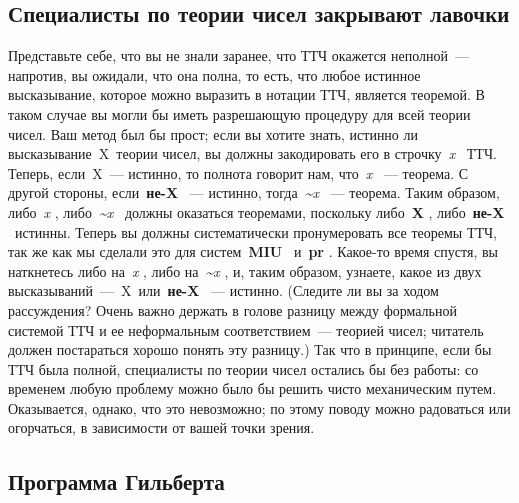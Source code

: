\documentclass[../main.tex]{subfiles}
\begin{document}
\subsection{Специалисты по теории чисел закрывают лавочки}

Представьте себе, что вы не знали заранее, что ТТЧ окажется неполной~--- напротив, вы ожидали, что она полна, то есть, что любое истинное высказывание, которое можно выразить в нотации ТТЧ, является теоремой. В таком случае вы могли бы иметь разрешающую процедуру для всей теории чисел. Ваш метод был бы прост; если вы хотите знать, истинно ли высказывание~X~теории чисел, вы должны закодировать его в строчку~\emph{x} ~ТТЧ. Теперь, если~X~--- истинно, то полнота говорит нам, что~\emph{x} ~--- теорема. С другой стороны, если~\textbf{не-X} ~--- истинно, тогда~\emph{\textasciitilde x} ~--- теорема. Таким образом, либо~\emph{x} , либо~\emph{\textasciitilde x} ~должны оказаться теоремами, поскольку либо~\textbf{X} , либо~\textbf{не-X} ~истинны. Теперь вы должны систематически пронумеровать все теоремы ТТЧ, так же как мы сделали это для систем~\textbf{MIU} ~и~\textbf{pr} . Какое-то время спустя, вы наткнетесь либо на~\emph{x} , либо на~\emph{\textasciitilde x} , и, таким образом, узнаете, какое из двух высказываний~---~X~или~\textbf{не-X} ~--- истинно. (Следите ли вы за ходом рассуждения? Очень важно держать в голове разницу между формальной системой ТТЧ и ее неформальным соответствием~--- теорией чисел; читатель должен постараться хорошо понять эту разницу.) Так что в принципе, если бы ТТЧ была полной, специалисты по теории чисел остались бы без работы: со временем любую проблему можно было бы решить чисто механическим путем. Оказывается, однако, что это невозможно; по этому поводу можно радоваться или огорчаться, в зависимости от вашей точки зрения.


\subsection{Программа Гильберта}
\end{document}
